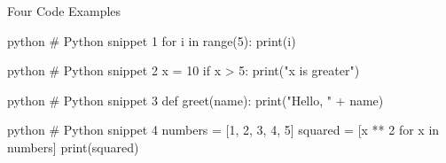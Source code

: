 \documentclass[
	11pt, 
]{beamer}
\begin{document}
\begin{frame}[fragile]{Four Code Examples}
    \small %
    \begin{minipage}[t]{0.42\textwidth}
        \begin{mintedbox}{python}
# Python snippet 1
for i in range(5):
    print(i)
        \end{mintedbox}
    \end{minipage}
    \hfill
    \begin{minipage}[t]{0.55\textwidth}
        \begin{mintedbox}{python}
# Python snippet 2
x = 10
if x > 5:
    print("x is greater")
        \end{mintedbox}
    \end{minipage}

    \vspace{1em} %

    \begin{minipage}[t]{1\textwidth}
        \begin{mintedbox}{python}
# Python snippet 3
def greet(name):
    print("Hello, " + name)
        \end{mintedbox}
    \end{minipage}
    
    \vspace{1em}
    
    \begin{minipage}[t]{1\textwidth}
        \begin{mintedbox}{python}
# Python snippet 4
numbers = [1, 2, 3, 4, 5]
squared = [x ** 2 for x in numbers]
print(squared)
        \end{mintedbox}
    \end{minipage}
\end{frame}

\end{document}
